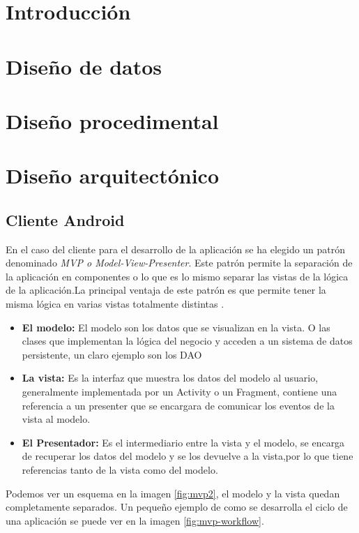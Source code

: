 
\section{Introducción}

\section{Diseño de datos}

\section{Diseño procedimental}

\section{Diseño arquitectónico}
	\subsection{Cliente Android}
	En el caso del cliente para el desarrollo de la aplicación se ha elegido un patrón denominado \textit{MVP o Model-View-Presenter}.
	Este patrón permite la separación de la aplicación en componentes o lo que es lo mismo separar las vistas de la lógica de la aplicación.La principal ventaja de este patrón es que permite tener la misma lógica en varias vistas totalmente distintas \cite{mvpantonio}.
	
	\begin{itemize}
		\item \textbf{El modelo: }El modelo son los datos que se visualizan en la vista. O las clases que implementan la lógica del negocio y acceden a un sistema de datos persistente, un claro ejemplo son los DAO
		\item \textbf{La vista: } Es la interfaz que muestra los datos del modelo al usuario, generalmente implementada por un Activity o un Fragment, contiene una referencia a un presenter que se encargara de comunicar los eventos de la vista al modelo.
		\item \textbf{El Presentador: } Es el intermediario entre la vista y el modelo, se encarga de recuperar los datos del modelo y se los devuelve a la vista,por lo que tiene referencias tanto de la vista como del modelo. 
	\end{itemize}
	Podemos ver un esquema en la imagen \ref{fig:mvp2}, el modelo y la vista quedan completamente separados. Un pequeño ejemplo de como se desarrolla el ciclo de una aplicación se puede ver en la imagen \ref{fig:mvp-workflow}.
	


